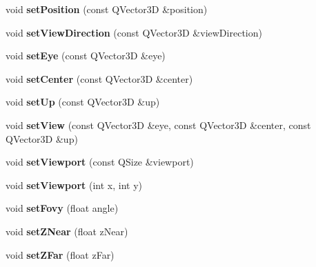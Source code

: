 \begin{DoxyCompactItemize}
\item 
\hypertarget{class_camera_a3ac4fcd89c146068205a3c8b73a86520}{}void {\bfseries set\+Position} (const Q\+Vector3\+D \&position)\label{class_camera_a3ac4fcd89c146068205a3c8b73a86520}

\item 
\hypertarget{class_camera_a61a059ce3aedc779f9087dda9b5e227c}{}void {\bfseries set\+View\+Direction} (const Q\+Vector3\+D \&view\+Direction)\label{class_camera_a61a059ce3aedc779f9087dda9b5e227c}

\item 
\hypertarget{class_camera_aa445664f0bf5f3cd892a99125e4bc786}{}void {\bfseries set\+Eye} (const Q\+Vector3\+D \&eye)\label{class_camera_aa445664f0bf5f3cd892a99125e4bc786}

\item 
\hypertarget{class_camera_ae0594124b7a1baf13ef38de7a6bd0ed8}{}void {\bfseries set\+Center} (const Q\+Vector3\+D \&center)\label{class_camera_ae0594124b7a1baf13ef38de7a6bd0ed8}

\item 
\hypertarget{class_camera_a037ef3f032c7fc09fa1f044260dd3a09}{}void {\bfseries set\+Up} (const Q\+Vector3\+D \&up)\label{class_camera_a037ef3f032c7fc09fa1f044260dd3a09}

\item 
\hypertarget{class_camera_a995075e3b619176b72ad2ff0ab434ed8}{}void {\bfseries set\+View} (const Q\+Vector3\+D \&eye, const Q\+Vector3\+D \&center, const Q\+Vector3\+D \&up)\label{class_camera_a995075e3b619176b72ad2ff0ab434ed8}

\item 
\hypertarget{class_camera_ad47041196bf35fed448003491112f528}{}void {\bfseries set\+Viewport} (const Q\+Size \&viewport)\label{class_camera_ad47041196bf35fed448003491112f528}

\item 
\hypertarget{class_camera_ab0794a4ebc430368c5c3731e9bb35cdc}{}void {\bfseries set\+Viewport} (int x, int y)\label{class_camera_ab0794a4ebc430368c5c3731e9bb35cdc}

\item 
\hypertarget{class_camera_aa0e1d52fdb7e3d060041b960fa8b5c24}{}void {\bfseries set\+Fovy} (float angle)\label{class_camera_aa0e1d52fdb7e3d060041b960fa8b5c24}

\item 
\hypertarget{class_camera_a4a8cda23fc022255f30452f608c66081}{}void {\bfseries set\+Z\+Near} (float z\+Near)\label{class_camera_a4a8cda23fc022255f30452f608c66081}

\item 
\hypertarget{class_camera_a8ab94de2388acc72fa129fa203ccc587}{}void {\bfseries set\+Z\+Far} (float z\+Far)\label{class_camera_a8ab94de2388acc72fa129fa203ccc587}

\end{DoxyCompactItemize}
